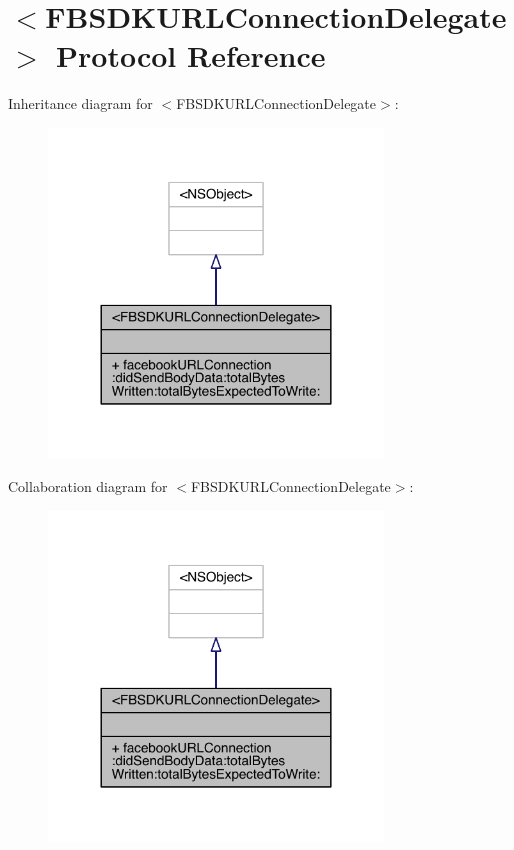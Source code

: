 \hypertarget{protocol_f_b_s_d_k_u_r_l_connection_delegate-p}{\section{$<$F\-B\-S\-D\-K\-U\-R\-L\-Connection\-Delegate$>$ Protocol Reference}
\label{protocol_f_b_s_d_k_u_r_l_connection_delegate-p}
}


Inheritance diagram for $<$F\-B\-S\-D\-K\-U\-R\-L\-Connection\-Delegate$>$\-:
\nopagebreak
\begin{figure}[H]
\begin{center}
\leavevmode
\includegraphics[width=252pt]{protocol_f_b_s_d_k_u_r_l_connection_delegate-p__inherit__graph}
\end{center}
\end{figure}


Collaboration diagram for $<$F\-B\-S\-D\-K\-U\-R\-L\-Connection\-Delegate$>$\-:
\nopagebreak
\begin{figure}[H]
\begin{center}
\leavevmode
\includegraphics[width=252pt]{protocol_f_b_s_d_k_u_r_l_connection_delegate-p__coll__graph}
\end{center}
\end{figure}
